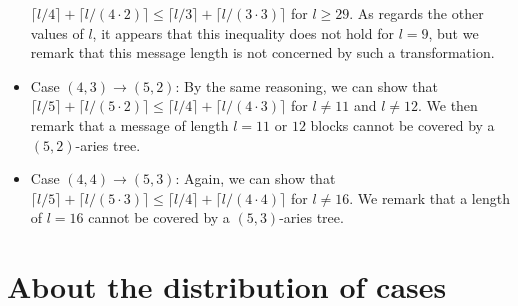 \documentclass{llncs}
\begin{document}
\begin{remark}
\begin{itemize}
  $\lceil l/4 \rceil + \lceil l/(4 \cdot 2) \rceil \leq \lceil l/3 \rceil + \lceil l/(3 \cdot 3) \rceil$
  for $l \geq 29$. As regards the other values of $l$, it appears that this inequality does not hold
  for $l=9$, but we remark that this message length is not concerned by such a transformation.
  \item Case $(4,3) \rightarrow (5,2)$: By the same reasoning, we can show that 
  $\lceil l/5 \rceil + \lceil l/(5 \cdot 2) \rceil \leq \lceil l/4 \rceil + \lceil l/(4 \cdot 3) \rceil$ for $l \neq 11$ and $l \neq 12$.
  We then remark that a message of length $l=11$ or $12$ blocks cannot be covered by a $(5,2)$-aries tree.
  \item Case $(4,4) \rightarrow (5,3)$: Again, we can show that 
  $\lceil l/5 \rceil + \lceil l/(5 \cdot 3) \rceil \leq \lceil l/4 \rceil + \lceil l/(4 \cdot 4) \rceil$ for $l \neq 16$.
  We remark that a length of $l=16$ cannot be covered by a $(5,3)$-aries tree.
 \end{itemize}

\end{remark}

\section{About the distribution of cases}\label{prob_dist}
\end{document}
